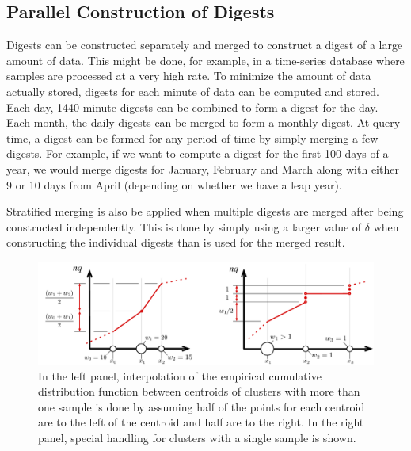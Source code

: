 \documentclass{vldb}
\begin{document}
\subsection{Parallel Construction of Digests}
Digests can be constructed separately and merged to construct a digest of a large amount of data. This might be done, for example, in a time-series database where samples are processed at a very high rate. To minimize the amount of data actually stored, digests for each minute of data can be computed and stored. Each day, 1440 minute digests can be combined to form a digest for the day. Each month, the daily digests can be merged to form a monthly digest. At query time, a digest can be formed for any period of time by simply merging a few digests. For example, if we want to compute a digest for the first 100 days of a year, we would merge digests for January, February and March along with either 9 or 10 days from April (depending on whether we have a leap year).

Stratified merging is also be applied when multiple digests are merged after being constructed independently. This is done by simply using a larger value of $\delta$ when constructing the individual digests than is used for the merged result. 

\begin{figure}[htb] %
   \centering
   \includegraphics[width=5in]{figures/combined.pdf} 
   \caption{In the left panel, interpolation of the empirical cumulative distribution function between centroids of clusters with more than one sample is done by assuming half of the points for each centroid are to the left of the centroid and half are to the right. In the right panel, special handling for clusters with a single sample is shown. }
   \label{fig:combined}
\end{figure}
\end{document}
